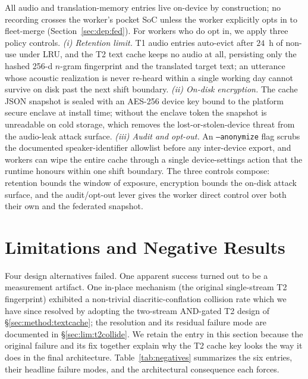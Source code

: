 \documentclass[a4paper,fleqn]{cas-dc}
\begin{document}
All audio and translation-memory entries live on-device by construction; no recording crosses the worker's pocket SoC unless the worker explicitly opts in to fleet-merge (Section~\ref{sec:dep:fed}). For workers who do opt in, we apply three policy controls. \emph{(i) Retention limit.} T1 audio entries auto-evict after $24$~h of non-use under LRU, and the T2 text cache keeps no audio at all, persisting only the hashed 256-d $n$-gram fingerprint and the translated target text; an utterance whose acoustic realization is never re-heard within a single working day cannot survive on disk past the next shift boundary. \emph{(ii) On-disk encryption.} The cache JSON snapshot is sealed with an AES-256 device key bound to the platform secure enclave at install time; without the enclave token the snapshot is unreadable on cold storage, which removes the lost-or-stolen-device threat from the audio-leak attack surface. \emph{(iii) Audit and opt-out.} An \texttt{--anonymize} flag scrubs the documented speaker-identifier allowlist before any inter-device export, and workers can wipe the entire cache through a single device-settings action that the runtime honours within one shift boundary. The three controls compose: retention bounds the window of exposure, encryption bounds the on-disk attack surface, and the audit/opt-out lever gives the worker direct control over both their own and the federated snapshot.

\FloatBarrier
\section{Limitations and Negative Results}\label{sec:limitations}

Four design alternatives failed. One apparent success turned out to be a measurement artifact. One in-place mechanism (the original single-stream T2 fingerprint) exhibited a non-trivial diacritic-conflation collision rate which we have since resolved by adopting the two-stream AND-gated T2 design of \S\ref{sec:method:textcache}; the resolution and its residual failure mode are documented in \S\ref{sec:lim:t2collide}. We retain the entry in this section because the original failure and its fix together explain why the T2 cache key looks the way it does in the final architecture. Table~\ref{tab:negatives} summarizes the six entries, their headline failure modes, and the architectural consequence each forces.
\end{document}
